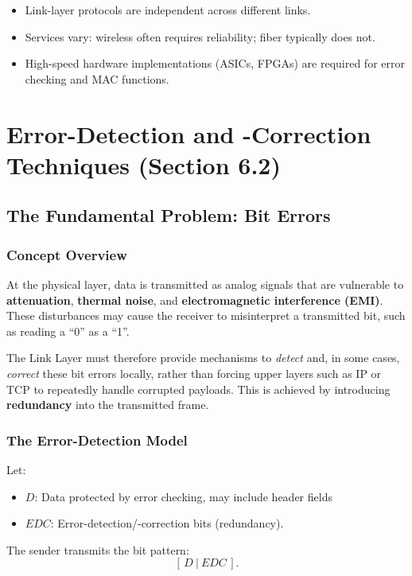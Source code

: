 \documentclass[12pt]{article}
\begin{document}
\begin{itemize}
    \item Link-layer protocols are independent across different links.
    \item Services vary: wireless often requires reliability; fiber typically does not.
    \item High-speed hardware implementations (ASICs, FPGAs) are required for error checking and MAC functions.
\end{itemize}

\section{Error-Detection and -Correction Techniques (Section 6.2)}

\subsection{The Fundamental Problem: Bit Errors}

\subsubsection{Concept Overview}

At the physical layer, data is transmitted as analog signals that are vulnerable to
\textbf{attenuation}, \textbf{thermal noise}, and \textbf{electromagnetic interference (EMI)}.
These disturbances may cause the receiver to misinterpret a transmitted bit, such as reading a
``0'' as a ``1''.

The Link Layer must therefore provide mechanisms to \emph{detect} and, in some cases,
\emph{correct} these bit errors locally, rather than forcing upper layers such as IP or TCP
to repeatedly handle corrupted payloads. This is achieved by introducing \textbf{redundancy}
into the transmitted frame.

\subsubsection{The Error-Detection Model}

Let:
\begin{itemize}
    \item $D$: Data protected by error checking, may include header fields
    \item $EDC$: Error-detection/-correction bits (redundancy).
\end{itemize}

The sender transmits the bit pattern:
\[
    [\, D \ | \ EDC \,].
\]
\end{document}
